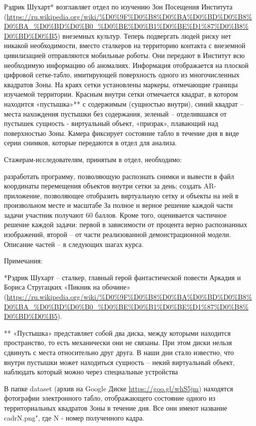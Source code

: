 Рэдрик Шухарт* возглавляет отдел по изучению Зон Посещения Института (\url{https://ru.wikipedia.org/wiki/%D0%9F%D0%B8%D0%BA%D0%BD%D0%B8%D0%BA_%D0%BD%D0%B0_%D0%BE%D0%B1%D0%BE%D1%87%D0%B8%D0%BD%D0%B5}) внеземных культур. Теперь подвергать людей риску нет никакой необходимости, вместо сталкеров на территорию контакта с внеземной цивилизацией отправляются мобильные роботы. Они передают в Институт всю необходимую информацию об аномалиях. Информация отображается на плоской цифровой сетке-табло, имитирующей поверхность одного из многочисленных квадратов Зоны. На краях сетки установлены маркеры, отмечающие границы изучаемой территории. Красным внутри сетки отмечается квадрат, в котором находится «пустышка»** с содержимым (сущностью внутри), синий квадрат – места нахождения пустышки без содержания, зеленый – отделившаяся от пустышек сущность - виртуальный объект, «призрак», плавающий над поверхностью Зоны. Камера фиксирует состояние табло в течение дня в виде серии снимков, которые передаются в отдел для анализа. 

Стажерам-исследователям, принятым в отдел, необходимо:

разработать программу, позволяющую распознать снимки и вывести в файл координаты перемещения объектов внутри сетки за день;
создать AR-приложение, позволяющее отобразить виртуальную сетку и объекты на ней в произвольном месте и масштабе
За полное и верное решение каждой части задачи участник получают 60 баллов. Кроме того, оценивается частичное решение каждой задачи: первой в зависимости от процента верно распознанных изображений, второй – от части реализованной демонстрационной модели. Описание частей – в следующих шагах курса.

Примечания:

*Рэдрик Шухарт – сталкер, главный герой фантастической повести Аркадия и Бориса Стругацких «Пикник на обочине» (\url{https://ru.wikipedia.org/wiki/%D0%9F%D0%B8%D0%BA%D0%BD%D0%B8%D0%BA_%D0%BD%D0%B0_%D0%BE%D0%B1%D0%BE%D1%87%D0%B8%D0%BD%D0%B5}).

** «Пустышка» представляет собой два диска, между которыми находится пространство, то есть механически они не связаны. При этом диски нельзя сдвинуть с места относительно друг друга. В наши дни стало известно, что внутри пустышки может находиться сущность – некий виртуальный объект, наблюдать который можно через специальные устройства


В папке dataset (архив на Google Диске \url{https://goo.gl/whS5jm}) находятся фотографии 
электронного табло, отображающего состояние одного из территориальных квадратов Зоны в течение дня. 
Все они имеют название cadrN.png", где N - номер полученного кадра.

